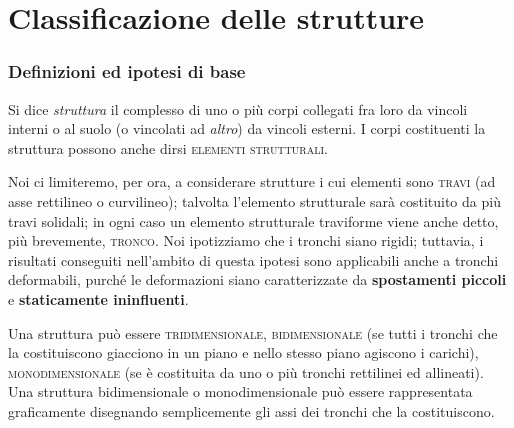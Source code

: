 \clearpage
\pagestyle{fancy}
\part{Classificazione delle strutture}
\setcounter{section}{0}
\section{Definizioni ed ipotesi di base}
\noindent Si dice \emph{struttura} il complesso di uno o più corpi collegati fra loro da vincoli interni o al suolo (o vincolati ad \emph{altro}) da vincoli esterni. I corpi costituenti la struttura possono anche dirsi \textsc{elementi strutturali}. 

\noindent Noi ci limiteremo, per ora, a considerare strutture i cui elementi sono \textsc{travi} (ad asse rettilineo o curvilineo); talvolta l'elemento strutturale sarà costituito da più travi solidali; in ogni caso un elemento strutturale traviforme viene anche detto, più brevemente, \textsc{tronco}. Noi ipotizziamo che i tronchi siano rigidi; tuttavia, i risultati conseguiti nell'ambito di questa ipotesi sono applicabili anche a tronchi deformabili, purché le deformazioni siano caratterizzate da \textbf{spostamenti piccoli} e \textbf{staticamente ininfluenti}. 

\noindent Una struttura può essere \textsc{tridimensionale}, \textsc{bidimensionale} (se tutti i tronchi che la costituiscono giacciono in un piano e nello stesso piano agiscono i carichi), \textsc{monodimensionale} (se è costituita da uno o più tronchi rettilinei ed allineati). Una struttura bidimensionale o monodimensionale può essere rappresentata graficamente disegnando semplicemente gli assi dei tronchi che la costituiscono. 
